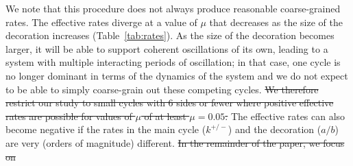 \documentclass[amsmath, preprintnumbers, 10pt, twocolumn, pre, bibliograpy]{revtex4-1}
\providecommand{\DIFdel}[1]{{\protect\color{red}\sout{#1}}}                      %
\providecommand{\DIFaddbegin}{} %
\providecommand{\DIFdelbegin}{} %
\providecommand{\DIFdelend}{} %
\newcommand{\DIFscaledelfig}{0.5}
\newlength{\DIFdelgraphicswidth} %
\newlength{\DIFdelgraphicsheight} %
\newcommand{\DIFaddincludegraphics}[2][]{{\color{blue}\fbox{\DIFOincludegraphics[#1]{#2}}}} %
\newcommand{\DIFdelincludegraphics}[2][]{%
\sbox{\DIFdelgraphicsbox}{\DIFOincludegraphics[#1]{#2}}%
\settoboxwidth{\DIFdelgraphicswidth}{\DIFdelgraphicsbox} %
\settoboxtotalheight{\DIFdelgraphicsheight}{\DIFdelgraphicsbox} %
\scalebox{\DIFscaledelfig}{%
\parbox[b]{\DIFdelgraphicswidth}{\usebox{\DIFdelgraphicsbox}\\[-\baselineskip] \rule{\DIFdelgraphicswidth}{0em}}\llap{\resizebox{\DIFdelgraphicswidth}{\DIFdelgraphicsheight}{%
\setlength{\unitlength}{\DIFdelgraphicswidth}%
\begin{picture}(1,1)%
\thicklines\linethickness{2pt} %
{\color[rgb]{1,0,0}\put(0,0){\framebox(1,1){}}}%
{\color[rgb]{1,0,0}\put(0,0){\line( 1,1){1}}}%
{\color[rgb]{1,0,0}\put(0,1){\line(1,-1){1}}}%
\end{picture}%
}\hspace*{3pt}}} %
} %
\DeclareRobustCommand{\DIFaddbegin}{\DIFOaddbegin \let\includegraphics\DIFaddincludegraphics} %
\DeclareRobustCommand{\DIFdelbegin}{\DIFOdelbegin \let\includegraphics\DIFdelincludegraphics} %
\DeclareRobustCommand{\DIFdelend}{\DIFOaddend \let\includegraphics\DIFOincludegraphics} %
\begin{document}
We note that this procedure does not always produce reasonable coarse-grained rates. The effective rates diverge at a value of $\mu$ that decreases as the size of the decoration increases (Table~\ref{tab:rates}). As the size of the decoration becomes larger, it will be able to support coherent oscillations of its own, leading to a system with multiple interacting periods of oscillation; in that case, one cycle is no longer dominant in terms of the dynamics of the system and we do not expect to be able to simply coarse-grain out these competing cycles. \DIFdelbegin \DIFdel{We therefore restrict our study to small cycles with 6 sides or fewer where positive effective rates are possible for values of $\mu$ of at least $\mu = 0.05$. }\DIFdelend The effective rates can also become negative if the rates in the main cycle ($k^{+/-}$) and the decoration ($a/b$) are very (orders of magnitude) different.
\DIFdelbegin \DIFdel{In the remainder of the paper, we focus on }\DIFdelend \DIFaddbegin 
\end{document}
